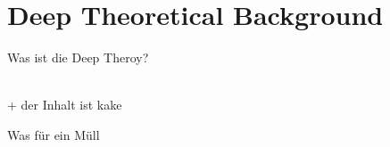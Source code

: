%
%
%
%

\chapter{Deep Theoretical Background}
\label{chap:background}

Was ist die Deep Theroy?

\blindtext \\ 

+ der Inhalt ist kake

\blindtext \newline

Was für ein Müll


%

